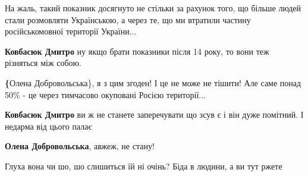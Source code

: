 \begin{itemize}
{На жаль, такий показник досягнуто не стільки за рахунок того, що більше людей
стали розмовляти Українською, а через те, що ми втратили частину
російськомовної території України...

\begin{itemize}{
 
\textbf{Ковбасюк Дмитро} ну якщо брати показники після 14 року, то вони теж різняться між собою.

 
\textbf\{Олена Добровольська\}, я з цим згоден! І це не може не тішити! Але саме понад 50\% - це через тимчасово окуповані Росією території...

 
\textbf{Ковбасюк Дмитро} ви ж не станете заперечувати що зсув є і він дуже помітний. І недарма від цього палає

 
\textbf{Олена Добровольська}, авжеж, не стану!
}\end{itemize}

 
Глуха вона чи шо, шо слишиться їй ні очінь? Біда в людини, а ви тут ржете


 

}
\end{itemize}
